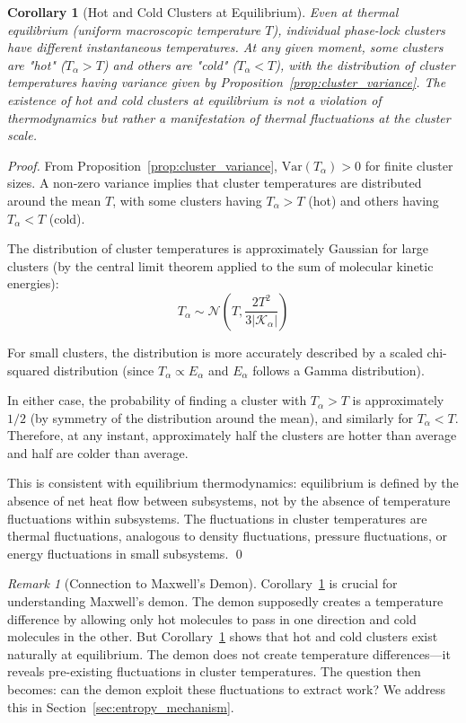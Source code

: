 \documentclass[12pt,a4paper]{article}
\newtheorem{corollary}[theorem]{Corollary}
\theoremstyle{definition}
\theoremstyle{remark}
\newtheorem{remark}[theorem]{Remark}
\begin{document}
\begin{corollary}[Hot and Cold Clusters at Equilibrium]
\label{cor:hot_cold_clusters}
Even at thermal equilibrium (uniform macroscopic temperature $T$), individual phase-lock clusters have different instantaneous temperatures. At any given moment, some clusters are "hot" ($T_\alpha > T$) and others are "cold" ($T_\alpha < T$), with the distribution of cluster temperatures having variance given by Proposition~\ref{prop:cluster_variance}. The existence of hot and cold clusters at equilibrium is not a violation of thermodynamics but rather a manifestation of thermal fluctuations at the cluster scale.
\end{corollary}

\begin{proof}
From Proposition~\ref{prop:cluster_variance}, $\text{Var}(T_\alpha) > 0$ for finite cluster sizes. A non-zero variance implies that cluster temperatures are distributed around the mean $T$, with some clusters having $T_\alpha > T$ (hot) and others having $T_\alpha < T$ (cold).

The distribution of cluster temperatures is approximately Gaussian for large clusters (by the central limit theorem applied to the sum of molecular kinetic energies):
\begin{equation}
T_\alpha \sim \mathcal{N}\left(T, \frac{2T^2}{3|\mathcal{K}_\alpha|}\right)
\end{equation}

For small clusters, the distribution is more accurately described by a scaled chi-squared distribution (since $T_\alpha \propto E_\alpha$ and $E_\alpha$ follows a Gamma distribution).

In either case, the probability of finding a cluster with $T_\alpha > T$ is approximately $1/2$ (by symmetry of the distribution around the mean), and similarly for $T_\alpha < T$. Therefore, at any instant, approximately half the clusters are hotter than average and half are colder than average.

This is consistent with equilibrium thermodynamics: equilibrium is defined by the absence of net heat flow between subsystems, not by the absence of temperature fluctuations within subsystems. The fluctuations in cluster temperatures are thermal fluctuations, analogous to density fluctuations, pressure fluctuations, or energy fluctuations in small subsystems. \qed
\end{proof}

\begin{remark}[Connection to Maxwell's Demon]
\label{rem:demon_fluctuations}
Corollary~\ref{cor:hot_cold_clusters} is crucial for understanding Maxwell's demon. The demon supposedly creates a temperature difference by allowing only hot molecules to pass in one direction and cold molecules in the other. But Corollary~\ref{cor:hot_cold_clusters} shows that hot and cold clusters exist naturally at equilibrium. The demon does not create temperature differences—it reveals pre-existing fluctuations in cluster temperatures. The question then becomes: can the demon exploit these fluctuations to extract work? We address this in Section~\ref{sec:entropy_mechanism}.
\end{remark}
\end{document}
